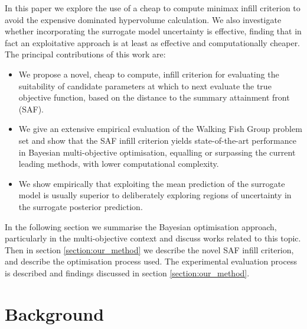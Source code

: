 \documentclass[conference]{IEEEtran}
\newcommand{\mnotejf}[2][\textcolor{blue}{\dagger}]{$#1$\marginpar{\color{blue}\raggedright\tiny$#1$ #2}}
\begin{document}
In this paper we explore the use of a cheap to compute minimax infill criterion to avoid the expensive dominated hypervolume calculation.  We also investigate whether incorporating the surrogate model uncertainty is effective, finding that in fact an exploitative approach is at least as effective and computationally cheaper. The principal contributions of this work are:
\begin{itemize}[left=0pt .. \parindent]
    \item We propose a novel, cheap to compute, infill criterion for evaluating the suitability of candidate parameters at  which to next evaluate the true objective function, %
    based on the distance to the summary attainment front (SAF). 
    \item We give an extensive empirical evaluation of the Walking Fish Group problem set \cite{huband2005scalable} and show that the SAF infill criterion yields state-of-the-art performance in Bayesian multi-objective optimisation, equalling or surpassing the current leading methods, with lower computational complexity. 
    \item We show empirically that exploiting the mean prediction of the surrogate model is  usually superior to deliberately exploring regions of uncertainty in the surrogate posterior prediction.  
\end{itemize}

In the following section we summarise the Bayesian optimisation approach, particularly in the multi-objective context and discuss works related to this topic.  Then in section \ref{section:our_method} we describe the novel SAF infill criterion, and describe the optimisation process used.  The experimental evaluation process is described and findings discussed in section \ref{section:our_method}.


\section{Background}
\end{document}
